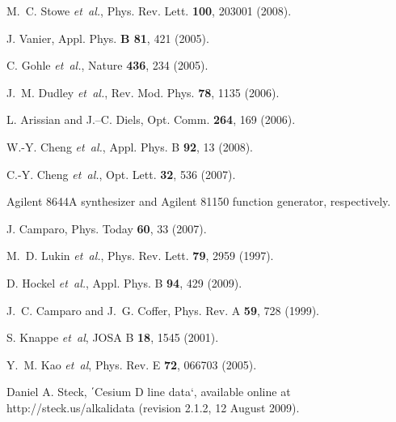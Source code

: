 \documentclass[%
reprint,  
aps,
prl,
showpacs,
preprint,
]{revtex4}
\begin{document}
\begin{references}


 M.~C. Stowe {\it et~al.}, Phys. Rev. Lett. {\bf 100}, 203001 (2008).

 J. Vanier, Appl. Phys. {\bf B 81}, 421 (2005).

 C. Gohle {\it et~al.}, Nature {\bf 436}, 234 (2005).

 J.~M. Dudley {\it et~al.}, Rev. Mod. Phys. {\bf 78}, 1135 (2006).

 L. Arissian and J.–C. Diels, Opt. Comm. {\bf 264}, 169 (2006).

 W.-Y. Cheng {\it et~al.}, Appl. Phys. B {\bf 92}, 13 (2008).

 C.-Y. Cheng {\it et~al.}, Opt. Lett. {\bf 32}, 536 (2007).

 Agilent 8644A synthesizer and Agilent 81150 function generator, respectively.

 J. Camparo, Phys. Today {\bf 60}, 33 (2007).

 M.~D. Lukin {\it et~al.}, Phys. Rev. Lett. {\bf 79}, 2959 (1997).

 D. Hockel {\it et~al.}, Appl. Phys. B {\bf 94}, 429 (2009).

 J.~C. Camparo and J.~G. Coffer, Phys. Rev. A {\bf 59}, 728 (1999).

 S. Knappe {\it et~al}, JOSA B {\bf 18}, 1545 (2001).

 Y.~M. Kao {\it et~al}, Phys. Rev. E {\bf 72}, 066703 (2005).

 Daniel A. Steck, ΄Cesium D line data‘, available online at http://steck.us/alkalidata (revision 2.1.2, 12 August 2009).








\end{references}
\end{document}
